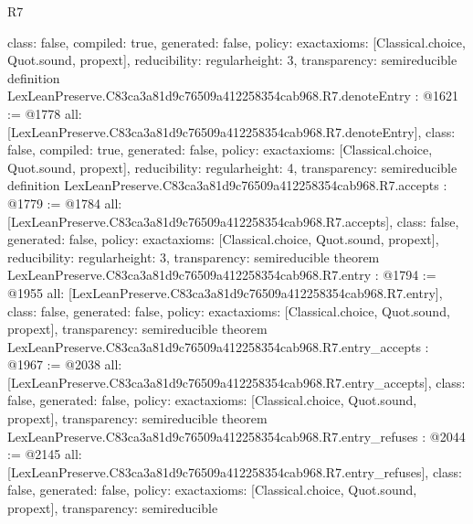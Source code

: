 \begin{lexlean}{R7}
\begin{coremodule}
{  class: false,
  compiled: true,
  generated: false,
  policy: exact{axioms: [Classical.choice, Quot.sound, propext]},
  reducibility: regular{height: 3},
  transparency: semireducible
}
definition LexLeanPreserve.C83ca3a81d9c76509a412258354cab968.R7.denoteEntry : @1621 := @1778 {
  all: [LexLeanPreserve.C83ca3a81d9c76509a412258354cab968.R7.denoteEntry],
  class: false,
  compiled: true,
  generated: false,
  policy: exact{axioms: [Classical.choice, Quot.sound, propext]},
  reducibility: regular{height: 4},
  transparency: semireducible
}
definition LexLeanPreserve.C83ca3a81d9c76509a412258354cab968.R7.accepts : @1779 := @1784 {
  all: [LexLeanPreserve.C83ca3a81d9c76509a412258354cab968.R7.accepts],
  class: false,
  generated: false,
  policy: exact{axioms: [Classical.choice, Quot.sound, propext]},
  reducibility: regular{height: 3},
  transparency: semireducible
}
theorem LexLeanPreserve.C83ca3a81d9c76509a412258354cab968.R7.entry : @1794 := @1955 {
  all: [LexLeanPreserve.C83ca3a81d9c76509a412258354cab968.R7.entry],
  class: false,
  generated: false,
  policy: exact{axioms: [Classical.choice, Quot.sound, propext]},
  transparency: semireducible
}
theorem LexLeanPreserve.C83ca3a81d9c76509a412258354cab968.R7.entry_accepts : @1967 := @2038 {
  all: [LexLeanPreserve.C83ca3a81d9c76509a412258354cab968.R7.entry_accepts],
  class: false,
  generated: false,
  policy: exact{axioms: [Classical.choice, Quot.sound, propext]},
  transparency: semireducible
}
theorem LexLeanPreserve.C83ca3a81d9c76509a412258354cab968.R7.entry_refuses : @2044 := @2145 {
  all: [LexLeanPreserve.C83ca3a81d9c76509a412258354cab968.R7.entry_refuses],
  class: false,
  generated: false,
  policy: exact{axioms: [Classical.choice, Quot.sound, propext]},
  transparency: semireducible
}


\end{coremodule}
\end{lexlean}
